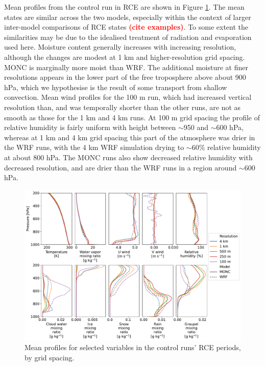 \documentclass[draft]{agujournal2019}
\newcommand{\todo}[1]{\textcolor{red}{\textbf{(#1)}}}
\begin{document}
Mean profiles from the control run in RCE are shown in Figure
\ref{fig:rce_profiles}. The mean states are similar across the two models,
especially within the context of larger inter-model comparisons of RCE states
\todo{cite examples}. To some extent the similarities may be due to the
idealised treatment of radiation and evaporation used here. Moisture content
generally increases with increasing resolution, although the changes are modest
at 1 km and higher-resolution grid spacing. MONC is marginally more moist than
WRF. The additional moisture at finer resolutions appears in the lower part of
the free troposphere above about 900 hPa, which we hypothesise is the result of
some transport from shallow convection. Mean wind profiles for the 100 m run,
which had increased vertical resolution than, and was temporally shorter than
the other runs, are not as smooth as those for the 1 km and 4 km runs. At 100 m
grid spacing the profile of relative humidity is fairly uniform with height
between $\sim$950 and $\sim$600 hPa, whereas at 1 km and 4 km grid spacing this
part of the atmosphere was drier in the WRF runs, with the 4 km WRF simulation
drying to $\sim$60\% relative humidity at about 800 hPa. The MONC runs also show
decreased relative humidity with decreased resolution, and are drier than the
WRF runs in a region around $\sim$600 hPa.

\begin{figure}[pth]
    \noindent\includegraphics[width=\textwidth]{figures/rce_profiles}
    \caption{Mean profiles for selected variables in the control runs' RCE
    periods, by grid spacing.}
    \label{fig:rce_profiles}
\end{figure}
\end{document}
